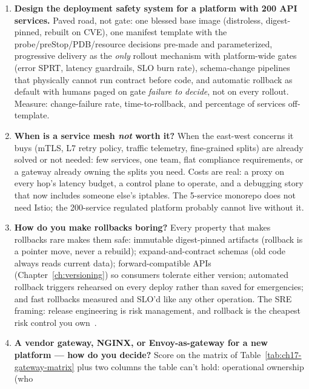 \begin{enumerate}[label=\textbf{Q\arabic*.}, leftmargin=1.6cm, start=29]
  \item \textbf{Design the deployment safety system for a platform with
        200 API services.}
        Paved road, not gate: one blessed base image (distroless,
        digest-pinned, rebuilt on CVE), one manifest template with the
        probe/preStop/PDB/resource decisions pre-made and parameterized,
        progressive delivery as the \emph{only} rollout mechanism with
        platform-wide gates (error SPRT, latency guardrails, SLO burn
        rate), schema-change pipelines that physically cannot run
        contract before code, and automatic rollback as default with
        humans paged on gate \emph{failure to decide}, not on every
        rollout. Measure: change-failure rate, time-to-rollback, and
        percentage of services off-template.
  \item \textbf{When is a service mesh \emph{not} worth it?}
        When the east-west concerns it buys (mTLS, L7 retry policy,
        traffic telemetry, fine-grained splits) are already solved or not
        needed: few services, one team, flat compliance requirements, or
        a gateway already owning the splits you need. Costs are real: a
        proxy on every hop's latency budget, a control plane to operate,
        and a debugging story that now includes someone else's iptables.
        The 5-service monorepo does not need Istio; the 200-service
        regulated platform probably cannot live without it.
  \item \textbf{How do you make rollbacks boring?}
        Every property that makes rollbacks rare makes them safe:
        immutable digest-pinned artifacts (rollback is a pointer move,
        never a rebuild); expand-and-contract schemas (old code always
        reads current data); forward-compatible APIs
        (Chapter~\ref{ch:versioning}) so consumers tolerate either
        version; automated rollback triggers rehearsed on every deploy
        rather than saved for emergencies; and fast rollbacks measured
        and SLO'd like any other operation. The SRE framing: release
        engineering is risk management, and rollback is the cheapest
        risk control you own~\cite{beyer2016sre}.
  \item \textbf{A vendor gateway, NGINX, or Envoy-as-gateway for a new
        platform --- how do you decide?}
        Score on the matrix of Table~\ref{tab:ch17-gateway-matrix} plus
        two columns the table can't hold: operational ownership (who

\end{enumerate}
